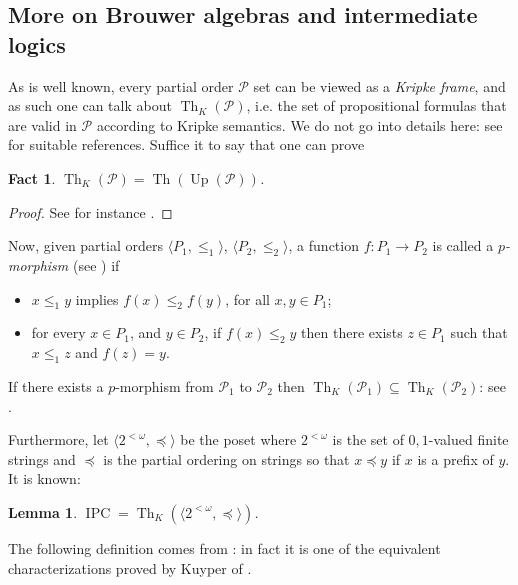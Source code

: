 \documentclass[11pt]{amsart}
\newtheorem{fact}[theorem]{Fact}
\newtheorem{lemma}[theorem]{Lemma}
\DeclareMathOperator{\up}{Up}
\newcommand{\Th}{\operatorname{Th}}
\newcommand{\IPC}{\operatorname{IPC}}
\begin{document}
\subsection{More on Brouwer algebras and intermediate logics}

As is well known, every partial order $\mathscr{P}$ set can be viewed as a 
\emph{Kripke frame}, and as such one can talk about $\Th_K(\mathscr{P})$, 
i.e. the set of propositional formulas that are valid in $\mathscr{P}$ 
according to Kripke semantics. We do not go into details here: see 
\cite{Chagrov-Zakharyashev, Gabbay-book} for suitable references. Suffice it 
to say that one can prove 

\begin{fact}\label{fact:DeJongh}
$\Th_K(\mathscr{P})=\Th(\up(\mathscr{P}))$. 
\end{fact} 

\begin{proof}
See for instance \cite[Theorem~7.20]{Chagrov-Zakharyashev}.
\end{proof}

Now, given partial orders $\langle P_1, \leq_1\rangle$, $\langle P_2,
\leq_2\rangle$, a function $f: P_1 \longrightarrow P_2$ is called a
\emph{$p$-morphism} (see \cite{deJongh-Troelstra}) if
\begin{itemize}
  \item $x \leq_1 y$ implies $f(x) \leq_2 f(y)$, for all $x,y \in P_1$;
  \item for every $x \in P_1$, and $y \in P_2$, if $f(x)\leq_2 y$ then
      there exists $z\in P_{1}$ such that $x\le_1 z$ and $f(z)=y$.
\end{itemize}
If there exists a $p$-morphism from $\mathscr{P}_1$ to $\mathscr{P}_2$ then
$\Th_K(\mathscr{P}_1) \subseteq \Th_K(\mathscr{P}_2)$: see
\cite[Corollary~2.17]{Chagrov-Zakharyashev}.

Furthermore, let $\langle 2^{<\omega}, \preceq \rangle$ be the poset where 
$2^{<\omega}$ is the set of $0,1$-valued finite strings and $\preceq$ is the 
partial ordering on strings so that $x \preceq y$ if $x$ is a prefix of $y$. 
It is known: 

\begin{lemma}\cite[Theorem~4.12]{Gabbay-book}
$\IPC=\Th_K\left(\langle 2^{<\omega}, \preceq \rangle\right)$.
\end{lemma}

The following definition comes from \cite{Kuyper-Muchnik}: in fact it is one 
of the equivalent characterizations proved by Kuyper of 
\cite[Definition~3.1]{Kuyper-Muchnik}. 
\end{document}
